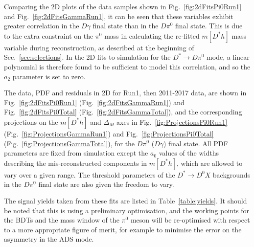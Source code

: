\documentclass[oneside,12pt]{article}
\begin{document}
Comparing the 2D plots of the data samples shown in Fig.~\ref{fig:2dFitsPi0Run1}
and Fig.~\ref{fig:2dFitsGammaRun1}, it can be seen that these variables exhibit
greater correlation in the $D\gamma$ final state than in the $D\pi^0$ final
state. This is due to the extra constraint on the $\pi^0$ mass in calculating
the re-fitted $m[D^*h]$ mass variable during reconstruction, as described at the
beginning of Sec.~\ref{sec:selections}. In the 2D fits to simulation for the
$D^*\rightarrow D\pi^0$ mode, a linear polynomial is therefore found to be
sufficient to model this correlation, and so the $a_2$ parameter is set to zero.

The data, PDF and residuals in 2D for Run1, then 2011-2017 data, are shown in
Fig.~\ref{fig:2dFitsPi0Run1} (Fig.~\ref{fig:2dFitsGammaRun1}) and
Fig.~\ref{fig:2dFitsPi0Total} (Fig.~\ref{fig:2dFitsGammaTotal}), and the
corresponding projections on the $m[D^*h]$ and $\Delta_M$ axes in
Fig.~\ref{fig:ProjectionsPi0Run1} (Fig.~\ref{fig:ProjectionsGammaRun1}) and
Fig.~\ref{fig:ProjectionsPi0Total} (Fig.~\ref{fig:ProjectionsGammaTotal}), for
the $D\pi^0$ ($D\gamma$) final state. All PDF parameters are fixed from
simulation except the $a_0$ values of the widths describing the
mis-reconstructed components in $m[D^{*}h]$, which are allowed to vary over a
given range. The threshold parameters of the $D^{*}\rightarrow D^0X$ backgrounds
in the $D\pi^0$ final state are also given the freedom to vary.

The signal yields taken from these fits are listed in Table~\ref{table:yields}.
It should be noted that this is using a preliminary optimisation, and the
working points for the BDTs and the mass window of the $\pi^0$ meson will be
re-optimised with respect to a more appropriate figure of merit, for example to
minimise the error on the asymmetry in the ADS mode.

\vspace{-3mm}
\end{document}
